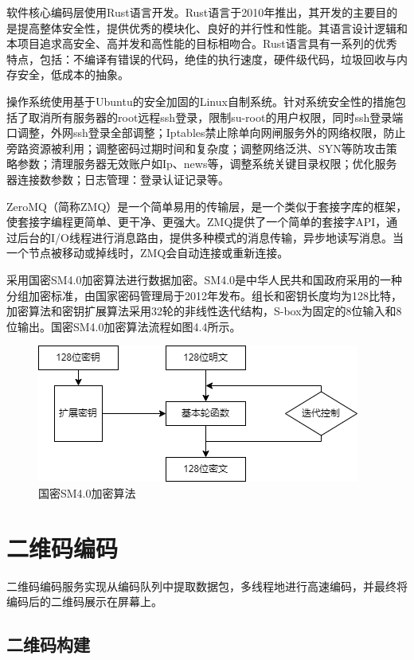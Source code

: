软件核心编码层使用Rust语言开发。Rust语言于2010年推出，其开发的主要目的是提高整体安全性，提供优秀的模块化、良好的并行性和性能。其语言设计逻辑和本项目追求高安全、高并发和高性能的目标相吻合。Rust语言具有一系列的优秀特点，包括：不编译有错误的代码，绝佳的执行速度，硬件级代码，垃圾回收与内存安全，低成本的抽象。

操作系统使用基于Ubuntu的安全加固的Linux自制系统。针对系统安全性的措施包括了取消所有服务器的root远程ssh登录，限制su-root的用户权限，同时ssh登录端口调整，外网ssh登录全部调整；Iptables禁止除单向网闸服务外的网络权限，防止旁路资源被利用；调整密码过期时间和复杂度；调整网络泛洪、SYN等防攻击策略参数；清理服务器无效账户如Ip、news等，调整系统关键目录权限；优化服务器连接数参数；日志管理：登录认证记录等。

ZeroMQ（简称ZMQ）是一个简单易用的传输层，是一个类似于套接字库的框架，使套接字编程更简单、更干净、更强大。ZMQ提供了一个简单的套接字API，通过后台的I/O线程进行消息路由，提供多种模式的消息传输，异步地读写消息。当一个节点被移动或掉线时，ZMQ会自动连接或重新连接。\cite{郑帅2014基于}

采用国密SM4.0加密算法进行数据加密。SM4.0是中华人民共和国政府采用的一种分组加密标准，由国家密码管理局于2012年发布。组长和密钥长度均为128比特，加密算法和密钥扩展算法采用32轮的非线性迭代结构，S-box为固定的8位输入和8位输出。国密SM4.0加密算法流程如图4.4所示。

\begin{figure}[!htbp]
\centering
\includegraphics[scale=0.8]{figures/SM4.png}
\caption{国密SM4.0加密算法}
\end{figure}

\section{二维码编码}

二维码编码服务实现从编码队列中提取数据包，多线程地进行高速编码，并最终将编码后的二维码展示在屏幕上。

\subsection{二维码构建}

